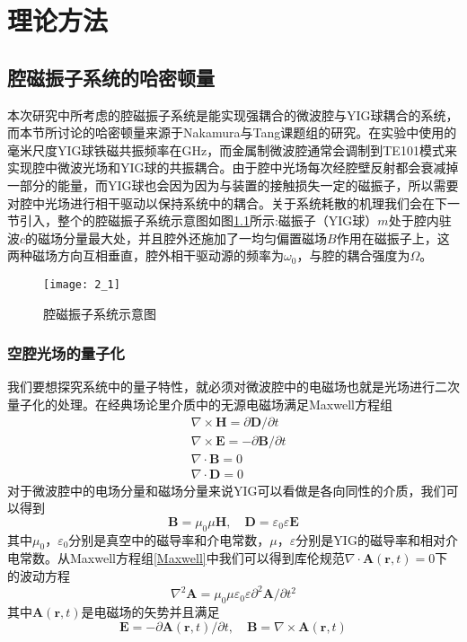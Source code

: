 
\chapter{理论方法}
\label{ch3}

\section{腔磁振子系统的哈密顿量}
本次研究中所考虑的腔磁振子系统是能实现强耦合的微波腔与YIG球耦合的系统，而本节所讨论的哈密顿量来源于Nakamura与Tang课题组的研究。在实验中使用的毫米尺度YIG球铁磁共振频率在GHz，而金属制微波腔通常会调制到TE101模式来实现腔中微波光场和YIG球的共振耦合。由于腔中光场每次经腔壁反射都会衰减掉一部分的能量，而YIG球也会因为因为与装置的接触损失一定的磁振子，所以需要对腔中光场进行相干驱动以保持系统中的耦合。关于系统耗散的机理我们会在下一节引入，整个的腔磁振子系统示意图如图\ref{FigSetup}所示:磁振子（YIG球）$m$处于腔内驻波$c$的磁场分量最大处，并且腔外还施加了一均匀偏置磁场$B$作用在磁振子上，这两种磁场方向互相垂直，腔外相干驱动源的频率为$\omega_0$，与腔的耦合强度为$\Omega$。
\begin{figure}[htbp]
	\centering
	\texttt{[image: 2\_1]}
	\caption{腔磁振子系统示意图} 
	\label{FigSetup}
\end{figure}

\subsection{空腔光场的量子化}
我们要想探究系统中的量子特性，就必须对微波腔中的电磁场也就是光场进行二次量子化的处理。在经典场论里介质中的无源电磁场满足Maxwell方程组
\begin{equation}
\begin{aligned}
& \nabla \times \mathbf{H}=\partial \mathbf{D} / \partial t \\
& \nabla \times \mathbf{E}=-\partial \mathbf{B} / \partial t \\
& \nabla \cdot \mathbf{B}=0 \\
& \nabla \cdot \mathbf{D}=0
\end{aligned}\label{Maxwell}
\end{equation}
对于微波腔中的电场分量和磁场分量来说YIG可以看做是各向同性的介质，我们可以得到
\begin{equation}
\mathbf{B} = \mu_{0} \mu \mathbf{H}, \quad \mathbf{D} = \varepsilon_0 \varepsilon \mathbf{E}
\end{equation}
其中$\mu_{0}$，$\varepsilon_0$分别是真空中的磁导率和介电常数，$\mu$，$\varepsilon$分别是YIG的磁导率和相对介电常数。从Maxwell方程组\eqref{Maxwell}中我们可以得到库伦规范$\nabla\cdot\mathbf{A}(\mathbf{r}, t)=0$下的波动方程
\begin{equation}
\nabla^{2} \mathbf{A}=\mu_{0}\mu \varepsilon_0\varepsilon \partial^{2} \mathbf{A} / \partial t^{2} \label{WaveFunction}
\end{equation}
其中$\mathbf{A}(\mathbf{r}, t)$是电磁场的矢势并且满足
\begin{equation}
\mathbf{E}=-\partial \mathbf{A}(\mathbf{r}, t) / \partial t, \quad \mathbf{B}=\nabla \times \mathbf{A}(\mathbf{r}, t)
\label{EBARelations}
\end{equation}

